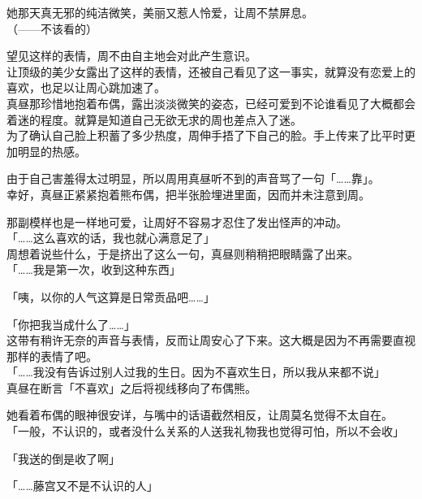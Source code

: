 她那天真无邪的纯洁微笑，美丽又惹人怜爱，让周不禁屏息。\\

（——不该看的）

望见这样的表情，周不由自主地会对此产生意识。\\

让顶级的美少女露出了这样的表情，还被自己看见了这一事实，就算没有恋爱上的喜欢，也足以让周心跳加速了。\\

真昼那珍惜地抱着布偶，露出淡淡微笑的姿态，已经可爱到不论谁看见了大概都会着迷的程度。就算是知道自己无欲无求的周也差点入了迷。\\

为了确认自己脸上积蓄了多少热度，周伸手捂了下自己的脸。手上传来了比平时更加明显的热感。

由于自己害羞得太过明显，所以周用真昼听不到的声音骂了一句「……靠」。\\

幸好，真昼正紧紧抱着熊布偶，把半张脸埋进里面，因而并未注意到周。

那副模样也是一样地可爱，让周好不容易才忍住了发出怪声的冲动。\\

「……这么喜欢的话，我也就心满意足了」\\

周想着说些什么，于是挤出了这么一句，真昼则稍稍把眼睛露了出来。\\

「……我是第一次，收到这种东西」

「咦，以你的人气这算是日常贡品吧……」

「你把我当成什么了……」\\

这带有稍许无奈的声音与表情，反而让周安心了下来。这大概是因为不再需要直视那样的表情了吧。\\

「……我没有告诉过别人过我的生日。因为不喜欢生日，所以我从来都不说」\\

真昼在断言「不喜欢」之后将视线移向了布偶熊。

她看着布偶的眼神很安详，与嘴中的话语截然相反，让周莫名觉得不太自在。\\

「一般，不认识的，或者没什么关系的人送我礼物我也觉得可怕，所以不会收」

「我送的倒是收了啊」

「……藤宫又不是不认识的人」\\

